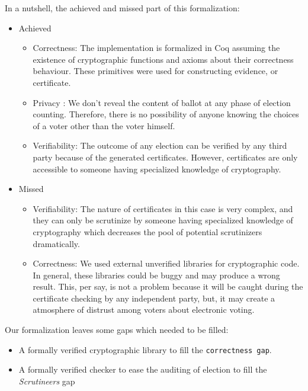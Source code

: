 In a nutshell, the achieved and missed part of this formalization:

\begin{itemize}
\item Achieved
\begin{itemize}
\item Correctness: The implementation is formalized in Coq assuming the 
         existence of cryptographic 
         functions and axioms about their correctness behaviour. These primitives were 
         used for constructing evidence, or certificate. 
         
\item Privacy : We don't reveal the content of ballot at any phase of election counting. Therefore, 
         there is no possibility of anyone knowing the choices of a voter other than the voter himself.
                 
\item Verifiability: The outcome of any election can be verified by any third party because 
          of the generated certificates. However, certificates are only accessible to someone 
          having specialized  knowledge of cryptography. 

\end{itemize}
\item Missed
\begin{itemize}
 \item Verifiability:  The nature of certificates in this case is very complex, and they can only be scrutinize 
          by someone having specialized knowledge of cryptography which decreases the pool of potential 
          scrutinizers dramatically.
              
 \item Correctness: We used external unverified libraries for cryptographic code.  In general, these libraries 
 		  could be buggy and 
          may produce a wrong result. This, per say, is not a problem because it will be caught during the 
          certificate checking by any independent party, but, it may create a atmosphere of distrust among 
          voters about electronic voting.  
 
 
\end{itemize}
\end{itemize}


Our formalization leaves some gaps which needed to be filled:
\begin{itemize}
\item A formally verified cryptographic library to fill the \texttt{correctness gap}.
\item A formally verified checker to ease the auditing of election to fill the \textit{Scrutineers} gap
\end{itemize}


